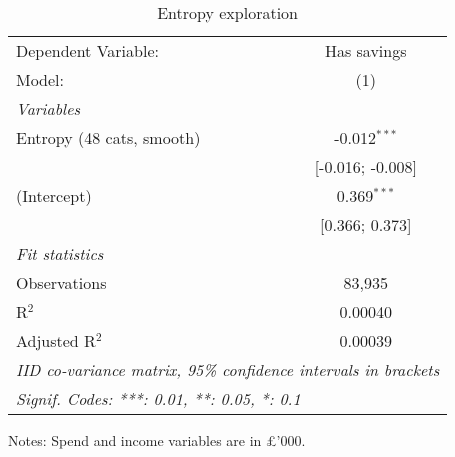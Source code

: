 
\begin{table}[htbp]
   \centering
   \tiny
   \begin{threeparttable}[b]
      \caption{\label{tab:reg_has_sa_inflows_explore} Entropy exploration}
      \begin{tabular}{lc}
         \tabularnewline \midrule \midrule
         Dependent Variable:       & Has savings\\  
         Model:                    & (1)\\  
         \midrule
         \emph{Variables}\\
         Entropy (48 cats, smooth) & -0.012$^{***}$\\   
                                   & [-0.016; -0.008]\\   
         (Intercept)               & 0.369$^{***}$\\   
                                   & [0.366; 0.373]\\   
         \midrule
         \emph{Fit statistics}\\
         Observations              & 83,935\\  
         R$^2$                     & 0.00040\\  
         Adjusted R$^2$            & 0.00039\\  
         \midrule \midrule
         \multicolumn{2}{l}{\emph{IID co-variance matrix, 95\% confidence intervals in brackets}}\\
         \multicolumn{2}{l}{\emph{Signif. Codes: ***: 0.01, **: 0.05, *: 0.1}}\\
      \end{tabular}
      
      \begin{tablenotes}\footnotesize
         \item Notes: Spend and income variables are in \pounds'000.
      \end{tablenotes}
   \end{threeparttable}
\end{table}


